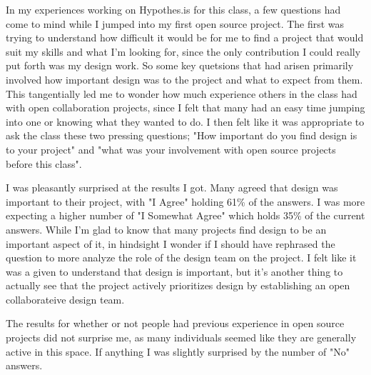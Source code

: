
In my experiences working on Hypothes.is for this class, a few questions had come to mind while I jumped into my first open source project. The first was trying to understand how difficult it would be for me to find a project that would suit my skills and what I'm looking for, since the only contribution I could really put forth was my design work. So some key quetsions that had arisen primarily involved how important design was to the project and what to expect from them. This tangentially led me to wonder how much experience others in the class had with open collaboration projects, since I felt that many had an easy time jumping into one or knowing what they wanted to do. I then felt like it was appropriate to ask the class these two pressing questions; "How important do you find design is to your project" and "what was your involvement with open source projects before this class". 

I was pleasantly surprised at the results I got. Many agreed that design was important to their project, with "I Agree" holding 61\% of the answers. I was more expecting a higher number of "I Somewhat Agree" which holds 35\% of the current answers. While I'm glad to know that many projects find design to be an important aspect of it, in hindsight I wonder if I should have rephrased the question to more analyze the role of the design team on the project. I felt like it was a given to understand that design is important, but it's another thing to actually see that the project actively prioritizes design by establishing an open collaborateive design team. 

The results for whether or not people had previous experience in open source projects did not surprise me, as many individuals seemed like they are generally active in this space. If anything I was slightly surprised by the number of "No" answers.

